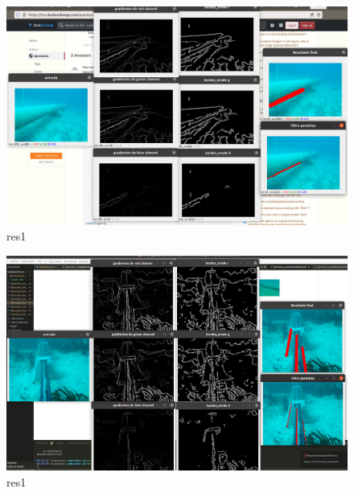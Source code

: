 \documentclass[12pt, a4paper]{article}
\begin{document}
\newpage
\begin{figure}[H]
    \includegraphics[scale=0.22]{images_doc/img4_results.png}
    \caption{res1}\label{fig:im4r}
\end{figure}
\begin{figure}[H]
    \includegraphics[scale=0.22]{images_doc/img5_results.png}
    \caption{res1}\label{fig:im5r}
\end{figure}
\end{document}
